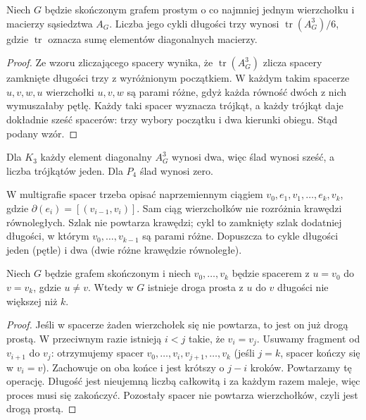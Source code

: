 \begin{stwierdzenie}
\label{prop:tg-trace-triangles}
Niech $G$ będzie skończonym grafem prostym o co najmniej
jednym wierzchołku i macierzy sąsiedztwa $A_G$.
Liczba jego cykli długości trzy wynosi
$\operatorname{tr}(A_G^3)/6$, gdzie $\operatorname{tr}$
oznacza sumę elementów diagonalnych macierzy.
\end{stwierdzenie}

\begin{proof}
Ze wzoru zliczającego spacery wynika, że
$\operatorname{tr}(A_G^3)$ zlicza spacery zamknięte
długości trzy z wyróżnionym początkiem. W każdym takim
spacerze $u,v,w,u$ wierzchołki $u,v,w$ są parami różne,
gdyż każda równość dwóch z nich wymuszałaby pętlę.
Każdy taki spacer wyznacza trójkąt, a każdy trójkąt
daje dokładnie sześć spacerów: trzy wybory początku
i dwa kierunki obiegu. Stąd podany wzór.
\end{proof}

\begin{przyklad}
Dla $K_3$ każdy element diagonalny $A_G^3$ wynosi dwa,
więc ślad wynosi sześć, a liczba trójkątów jeden.
Dla $P_4$ ślad wynosi zero.
\end{przyklad}


W multigrafie spacer trzeba opisać naprzemiennym ciągiem
$v_0,e_1,v_1,\ldots,e_k,v_k$, gdzie
$\partial(e_i)=[(v_{i-1},v_i)]$. Sam ciąg wierzchołków
nie rozróżnia krawędzi równoległych. Szlak nie powtarza
krawędzi; cykl to zamknięty szlak dodatniej długości,
w którym $v_0,\ldots,v_{k-1}$ są parami różne.
Dopuszcza to cykle długości jeden (pętle) i dwa
(dwie różne krawędzie równoległe).

\begin{lemat}
Niech $G$ będzie grafem skończonym i niech
$v_0,\ldots,v_k$ będzie spacerem z $u=v_0$
do $v=v_k$, gdzie $u\ne v$. Wtedy w $G$
istnieje droga prosta z $u$ do $v$ długości
nie większej niż $k$.
\end{lemat}

\begin{proof}
Jeśli w spacerze żaden wierzchołek się nie powtarza,
to jest on już drogą prostą. W przeciwnym razie istnieją
$i<j$ takie, że $v_i=v_j$. Usuwamy fragment od
$v_{i+1}$ do $v_j$: otrzymujemy spacer
$v_0,\ldots,v_i,v_{j+1},\ldots,v_k$
(jeśli $j=k$, spacer kończy się w $v_i=v$).
Zachowuje on oba końce i jest krótszy o $j-i$ kroków.
Powtarzamy tę operację. Długość jest nieujemną liczbą
całkowitą i za każdym razem maleje, więc proces
musi się zakończyć. Pozostały spacer nie powtarza
wierzchołków, czyli jest drogą prostą.
\end{proof}

